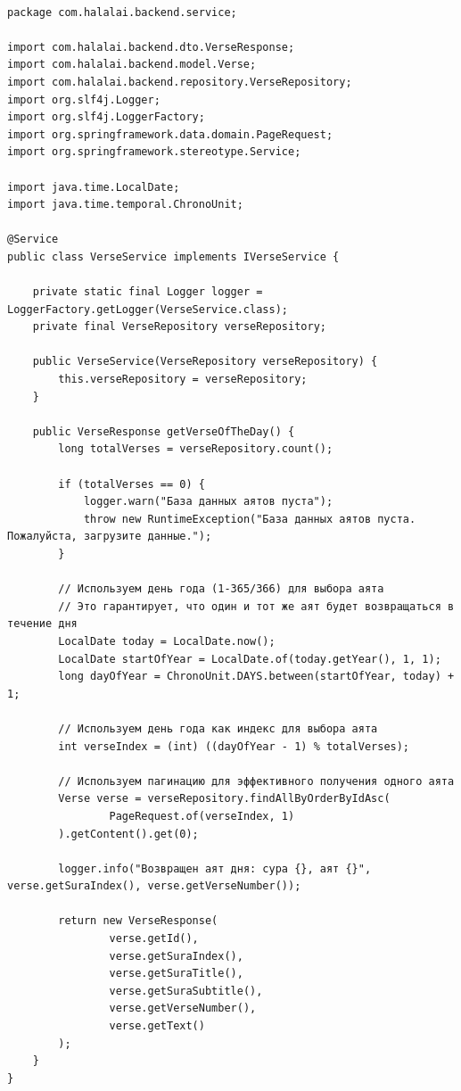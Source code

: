 \begin{lstlisting}[basicstyle=\tiny\ttfamily,breaklines=true]

package com.halalai.backend.service;

import com.halalai.backend.dto.VerseResponse;
import com.halalai.backend.model.Verse;
import com.halalai.backend.repository.VerseRepository;
import org.slf4j.Logger;
import org.slf4j.LoggerFactory;
import org.springframework.data.domain.PageRequest;
import org.springframework.stereotype.Service;

import java.time.LocalDate;
import java.time.temporal.ChronoUnit;

@Service
public class VerseService implements IVerseService {

    private static final Logger logger = LoggerFactory.getLogger(VerseService.class);
    private final VerseRepository verseRepository;

    public VerseService(VerseRepository verseRepository) {
        this.verseRepository = verseRepository;
    }

    public VerseResponse getVerseOfTheDay() {
        long totalVerses = verseRepository.count();
        
        if (totalVerses == 0) {
            logger.warn("База данных аятов пуста");
            throw new RuntimeException("База данных аятов пуста. Пожалуйста, загрузите данные.");
        }

        // Используем день года (1-365/366) для выбора аята
        // Это гарантирует, что один и тот же аят будет возвращаться в течение дня
        LocalDate today = LocalDate.now();
        LocalDate startOfYear = LocalDate.of(today.getYear(), 1, 1);
        long dayOfYear = ChronoUnit.DAYS.between(startOfYear, today) + 1;
        
        // Используем день года как индекс для выбора аята
        int verseIndex = (int) ((dayOfYear - 1) % totalVerses);
        
        // Используем пагинацию для эффективного получения одного аята
        Verse verse = verseRepository.findAllByOrderByIdAsc(
                PageRequest.of(verseIndex, 1)
        ).getContent().get(0);
        
        logger.info("Возвращен аят дня: сура {}, аят {}", verse.getSuraIndex(), verse.getVerseNumber());
        
        return new VerseResponse(
                verse.getId(),
                verse.getSuraIndex(),
                verse.getSuraTitle(),
                verse.getSuraSubtitle(),
                verse.getVerseNumber(),
                verse.getText()
        );
    }
}
\end{lstlisting}

